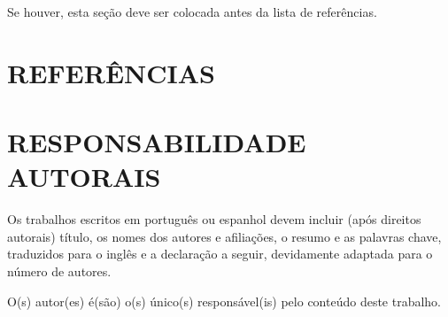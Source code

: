 \documentclass[10pt,fleqn,a4paper]{article}
\begin{document}
        Se houver, esta seção deve ser colocada antes da lista de referências.


    \section{REFERÊNCIAS}
        
        

    \section{RESPONSABILIDADE AUTORAIS}

        Os trabalhos escritos em português ou espanhol devem incluir (após direitos autorais) título, os nomes dos autores e afiliações, o resumo e as palavras chave, traduzidos para o inglês e a declaração a seguir, devidamente adaptada para o número de autores.
    
        O(s) autor(es) é(são) o(s) único(s) responsável(is) pelo conteúdo deste trabalho.

%
\end{document}
